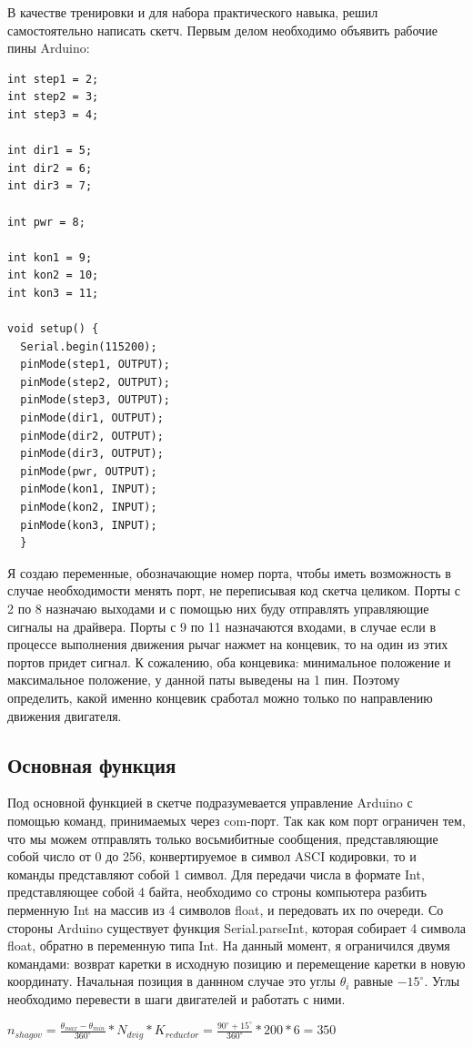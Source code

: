 В качестве тренировки и для набора практического навыка, решил самостоятельно написать скетч. Первым делом необходимо объявить рабочие пины Arduino:

\begin{lstlisting}[style=uno,caption=Объявление пинов Arduino]
int step1 = 2;
int step2 = 3;
int step3 = 4;

int dir1 = 5;
int dir2 = 6;
int dir3 = 7;

int pwr = 8;

int kon1 = 9;
int kon2 = 10;
int kon3 = 11;

void setup() {
  Serial.begin(115200);
  pinMode(step1, OUTPUT);
  pinMode(step2, OUTPUT);
  pinMode(step3, OUTPUT);
  pinMode(dir1, OUTPUT);
  pinMode(dir2, OUTPUT);
  pinMode(dir3, OUTPUT);
  pinMode(pwr, OUTPUT);
  pinMode(kon1, INPUT);
  pinMode(kon2, INPUT);
  pinMode(kon3, INPUT);
  }

\end{lstlisting}

Я создаю переменные, обозначающие номер порта, чтобы иметь возможность в случае необходимости менять порт, не переписывая код скетча целиком. Порты с 2 по 8 назначаю выходами и с помощью них буду отправлять управляющие сигналы на драйвера. Порты с 9 по 11 назначаются входами, в случае если в процессе выполнения движения рычаг нажмет на концевик, то на один из этих портов придет сигнал. К сожалению, оба концевика: минимальное положение и максимальное положение, у данной паты выведены на 1 пин. Поэтому определить, какой именно концевик сработал можно только по направлению движения двигателя.  


\subsection{Основная функция}

Под основной функцией в скетче подразумевается управление Arduino с помощью команд, принимаемых через com-порт. Так как ком порт ограничен тем, что мы можем отправлять только восьмибитные сообщения, представляющие собой число от 0 до 256, конвертируемое в символ ASCI кодировки, то и команды представляют собой 1 символ. Для передачи числа в формате Int, представляющее собой 4 байта, необходимо со строны компьютера разбить перменную Int на массив из 4 символов float, и передовать их по очереди. Со стороны Arduino существует функция Serial.parseInt, которая собирает 4 символа float, обратно в переменную типа Int. На данный момент, я ограничился двумя командами: возврат каретки в исходную позицию и перемещение каретки в новую координату. Начальная позиция в даннном случае это углы $\theta_{i}$ равные $-15^{\circ}$. Углы необходимо перевести в шаги двигателей и работать с ними.
\begin{center}
    $n_{shagov} = \frac{\theta_{max} - \theta_{min} }{360^{\circ}}* N_{dvig} * K_{reductor} = \frac{90^{\circ}+15^{\circ}}{360^{\circ}}*200*6 = 350$
\end{center}

